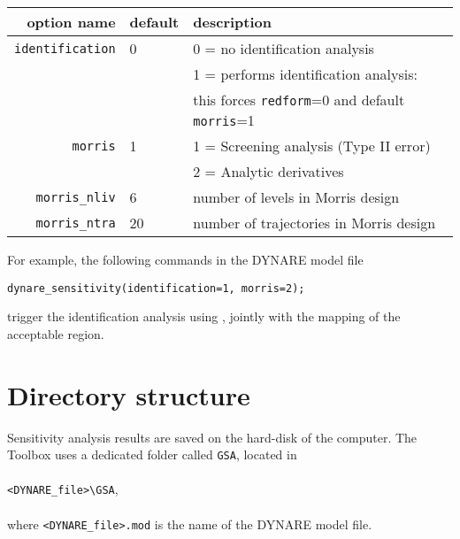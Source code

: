\documentclass[12pt,a4paper]{article}
\begin{document}
\vspace{1cm}


\begin{tabular}{r|l|l}
                option name & default & description  \\ \hline
       \verb"identification"& 0 & 0 = no identification analysis  \\
                            &   & 1 = performs identification analysis:\\
                            &   & this forces \verb"redform"=0 and default \verb"morris"=1\\
               \verb"morris"& 1 & 1 = Screening analysis (Type II error)\\
                            &   & 2 = Analytic derivatives \citep{Iskrev2010,Iskrev2011}\\
          \verb"morris_nliv"& 6 & number of levels in Morris design\\
          \verb"morris_ntra"& 20& number of trajectories in Morris design\\
\end{tabular}

\vspace{1cm}
\noindent For example, the following commands in the DYNARE model file

\vspace{1cm}
\noindent\verb"dynare_sensitivity(identification=1, morris=2);"

\vspace{1cm}
\noindent trigger the identification analysis using \cite{Iskrev2010,Iskrev2011}, jointly with the mapping of the acceptable region.


\newpage
\section{Directory structure}
Sensitivity analysis results are saved on the hard-disk of the
computer. The Toolbox uses a dedicated folder called \verb"GSA",
located in \\
\\
\verb"<DYNARE_file>\GSA", \\
\\
where \verb"<DYNARE_file>.mod" is the name of the DYNARE model
file.
\end{document}
